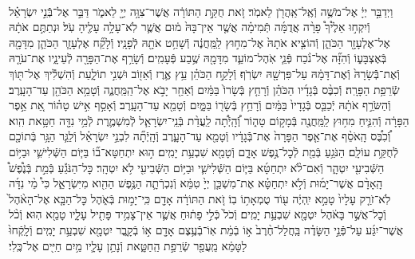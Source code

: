 \documentclass[twoside, openany, parskip=half, 11pt]{book}
\begin{document}
\begin{footnotesize}
\begin{multicols}{2}
\\
וַיְדַבֵּ֣ר יְיָ֔ אֶל־מֹשֶׁ֥ה וְֿאֶֽל־אַֽהֲרֹ֖ן לֵאמֹֽר׃ זֹ֚את חֻקַּ֣ת הַתּוֹרָ֔ה אֲשֶׁר־צִוָּ֥ה יְיָ֖ לֵאמֹ֑ר דַּבֵּ֣ר אֶל־בְּֿֿנֵ֣י יִשְׂרָאֵ֗ל וְֿיִקְח֣וּ אֵלֶ֩יךָ֩ פָרָ֨ה אֲדֻמָּ֜ה תְּֿמִימָ֗ה אֲשֶׁ֤ר אֵין־בָּהּ֙ מ֔וּם אֲשֶׁ֛ר לֹֽא־עָלָ֥ה עָלֶ֖יהָ עֹֽל׃ וּנְתַתֶּ֣ם אֹתָ֔הּ אֶל־אֶלְעָזָ֖ר הַכֹּהֵ֑ן וְֿהוֹצִ֤יא אֹתָהּ֙ אֶל־מִח֣וּץ לַֽמַּֽחֲנֶ֔ה וְֿשָׁחַ֥ט אֹתָ֖הּ לְֿפָנָֽיו׃ וְֿלָקַ֞ח אֶלְעָזָ֧ר הַכֹּהֵ֛ן מִדָּמָ֖הּ בְּֿאֶצְבָּע֑וֹ וְֿהִזָּ֞ה אֶל־נֹ֨כַח פְּֿנֵ֧י אֹֽהֶל־מוֹעֵ֛ד מִדָּמָ֖הּ שֶׁ֥בַע פְּֿעָמִֽים׃ וְֿשָׂרַ֥ף אֶת־הַפָּרָ֖ה לְֿעֵינָ֑יו אֶת־עֹרָ֤הּ וְֿאֶת־בְּֿֿשָׂרָהּ֙ וְֿאֶת־דָּמָ֔הּ עַל־פִּרְשָׁ֖הּ יִשְׂרֹֽף׃ וְֿלָקַ֣ח הַכֹּהֵ֗ן עֵ֥ץ אֶ֛רֶז וְֿאֵז֖וֹב וּשְׁנִ֣י תוֹלָ֑עַת וְֿהִשְׁלִ֕יךְ אֶל־תּ֖וֹךְ שְֿׂרֵפַ֥ת הַפָּרָֽה׃  וְֿכִבֶּ֨ס בְּֿגָדָ֜יו הַכֹּהֵ֗ן וְֿרָחַ֤ץ בְּֿשָׂרוֹ֙ בַּמַּ֔יִם וְֿאַחַ֖ר יָבֹ֣א אֶל־הַֽמַּֽחֲנֶ֑ה וְֿטָמֵ֥א הַכֹּהֵ֖ן עַד־הָעָֽרֶב׃ וְֿהַשֹּׂרֵ֣ף אֹתָ֔הּ יְֿכַבֵּ֤ס בְּֿגָדָיו֙ בַּמַּ֔יִם וְֿרָחַ֥ץ בְּֿשָׂר֖וֹ בַּמָּ֑יִם וְֿטָמֵ֖א עַד־הָעָֽרֶב׃ וְֿאָסַ֣ף אִ֣ישׁ טָה֗וֹר אֵ֚ת אֵ֣פֶר הַפָּרָ֔ה וְֿהִנִּ֛יחַ מִח֥וּץ לַֽמַּֽחֲנֶ֖ה בְּֿמָק֣וֹם טָה֑וֹר וְֽֿ֠הָֽיְֿתָ֠ה לַֽעֲדַ֨ת בְּֿנֵֽי־יִשְׂרָאֵ֧ל לְֿמִשְׁמֶ֛רֶת לְֿמֵ֥י נִדָּ֖ה חַטָּ֥את הִֽוא׃
וְֿ֠כִבֶּ֠ס הָֽאֹסֵ֨ף אֶת־אֵ֤פֶר הַפָּרָה֙ אֶת־בְּֿֿגָדָ֔יו וְֿטָמֵ֖א עַד־הָעָ֑רֶב וְֽֿהָֽיְֿתָ֞ה לִבְנֵ֣י יִשְׂרָאֵ֗ל וְֿלַגֵּ֛ר הַגָּ֥ר בְּֿתוֹכָ֖ם לְֿחֻקַּ֥ת עוֹלָֽם׃
הַנֹּגֵ֥עַ בְּֿמֵ֖ת לְֿכׇל־נֶ֣פֶשׁ אָדָ֑ם וְֿטָמֵ֖א שִׁבְעַ֥ת יָמִֽים׃ ה֣וּא יִתְחַטָּא־ב֞וֹ בַּיּ֧וֹם הַשְּֿׁלִישִׁ֛י וּבַיּ֥וֹם הַשְּֿׁבִיעִ֖י יִטְהָ֑ר וְֿאִם־לֹ֨א יִתְחַטָּ֜א בַּיּ֧וֹם הַשְּֿׁלִישִׁ֛י וּבַיּ֥וֹם הַשְּֿׁבִיעִ֖י לֹ֥א יִטְהָֽר׃ כׇּל־הַנֹּגֵ֡עַ בְּֿמֵ֣ת בְּֿנֶ֩פֶשׁ֩ הָֽאָדָ֨ם אֲשֶׁר־יָמ֜וּת וְֿלֹ֣א יִתְחַטָּ֗א אֶת־מִשְׁכַּ֤ן יְיָ֙ טִמֵּ֔א וְֿנִכְרְֿתָ֛ה הַנֶּ֥פֶשׁ הַהִ֖וא מִיִּשְׂרָאֵ֑ל כִּי֩ מֵ֨י נִדָּ֜ה לֹֽא־זֹרַ֤ק עָלָיו֙ טָמֵ֣א יִֽהְיֶ֔ה ע֖וֹד טֻמְאָת֥וֹ בֽוֹ׃ זֹ֚את הַתּוֹרָ֔ה אָדָ֖ם כִּֽי־יָמ֣וּת בְּֿאֹ֑הֶל כׇּל־הַבָּ֤א אֶל־הָאֹ֨הֶל֙ וְֿכׇל־אֲשֶׁ֣ר בָּאֹ֔הֶל יִטְמָ֖א שִׁבְעַ֥ת יָמִֽים׃ וְֿכֹל֙ כְּֿלִ֣י פָת֔וּחַ אֲשֶׁ֛ר אֵין־צָמִ֥יד פָּתִ֖יל עָלָ֑יו טָמֵ֖א הֽוּא׃ וְֿכֹ֨ל אֲשֶׁר־יִגַּ֜ע עַל־פְּֿֿנֵ֣י הַשָּׂדֶ֗ה בַּֽחֲלַל־חֶ֨רֶב֙ א֣וֹ בְֿמֵ֔ת אֽוֹ־בְֿֿעֶ֥צֶם אָדָ֖ם א֣וֹ בְֿקָ֑בֶר יִטְמָ֖א שִׁבְעַ֥ת יָמִֽים׃ וְֿלָֽקְֿחוּ֙ לַטָּמֵ֔א מֵֽעֲפַ֖ר שְֿׂרֵפַ֣ת הַֽחַטָּ֑את וְֿנָתַ֥ן עָלָ֛יו מַ֥יִם חַיִּ֖ים אֶל־כֶּֽלִי׃


\end{multicols}
\end{footnotesize}
\end{document}
